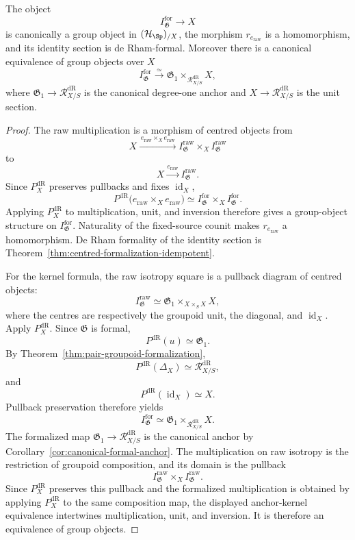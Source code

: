 \begin{theorem}
\label{thm:isotropy-group}
The object
\[
    I^{\mathrm{for}}_{\mathfrak G}\to X
\]
is canonically a group object in $(\mathcal H_{\Sp})_{/X}$, the morphism
$r_{e_{\mathrm{raw}}}$ is a homomorphism, and its identity section is de Rham-formal.  Moreover there is a canonical equivalence of group objects
over $X$
\[
    I^{\mathrm{for}}_{\mathfrak G}
    \xrightarrow{\simeq}
    \mathfrak G_1
    \times_{\mathcal R^{\mathrm{dR}}_{X/S}}
    X,
\]
where $\mathfrak G_1\to \mathcal R^{\mathrm{dR}}_{X/S}$ is the canonical degree-one anchor and
$X\to \mathcal R^{\mathrm{dR}}_{X/S}$ is the unit section.
\end{theorem}

\begin{proof}
The raw multiplication is a morphism of centred objects from
\[
    X\xrightarrow{\,e_{\mathrm{raw}}\times_Xe_{\mathrm{raw}}\,}
    I^{\mathrm{raw}}_{\mathfrak G}\times_XI^{\mathrm{raw}}_{\mathfrak G}
\]
to
\[
    X\xrightarrow{e_{\mathrm{raw}}}I^{\mathrm{raw}}_{\mathfrak G}.
\]
Since $P_X^{\mathrm{dR}}$ preserves pullbacks and fixes
$\operatorname{id}_X$,
\[
    P^{\mathrm{dR}}
    \bigl(e_{\mathrm{raw}}\times_Xe_{\mathrm{raw}}\bigr)
    \simeq
    I^{\mathrm{for}}_{\mathfrak G}
    \times_X
    I^{\mathrm{for}}_{\mathfrak G}.
\]
Applying $P_X^{\mathrm{dR}}$ to multiplication, unit, and inversion therefore gives a
group-object structure on $I^{\mathrm{for}}_{\mathfrak G}$.  Naturality of the fixed-source counit makes $r_{e_{\mathrm{raw}}}$ a homomorphism.  De Rham formality of the identity
section is Theorem~\ref{thm:centred-formalization-idempotent}.

For the kernel formula, the raw isotropy square is a pullback diagram of
centred objects:
\[
    I^{\mathrm{raw}}_{\mathfrak G}
    \simeq
    \mathfrak G_1
    \times_{X\times_SX}
    X,
\]
where the centres are respectively the groupoid unit, the diagonal, and
$\operatorname{id}_X$.  Apply $P_X^{\mathrm{dR}}$.  Since $\mathfrak G$ is formal,
\[
    P^{\mathrm{dR}}(u)\simeq\mathfrak G_1.
\]
By Theorem~\ref{thm:pair-groupoid-formalization},
\[
    P^{\mathrm{dR}}(\Delta_X)\simeq \mathcal R^{\mathrm{dR}}_{X/S},
\]
and
\[
    P^{\mathrm{dR}}(\operatorname{id}_X)\simeq X.
\]
Pullback preservation therefore yields
\[
    I^{\mathrm{for}}_{\mathfrak G}
    \simeq
    \mathfrak G_1\times_{\mathcal R^{\mathrm{dR}}_{X/S}}X.
\]
The formalized map $\mathfrak G_1\to \mathcal R^{\mathrm{dR}}_{X/S}$ is the canonical anchor by
Corollary~\ref{cor:canonical-formal-anchor}.  The multiplication on raw
isotropy is the restriction of groupoid composition, and its domain is the
pullback
\[
    I^{\mathrm{raw}}_{\mathfrak G}
    \times_X
    I^{\mathrm{raw}}_{\mathfrak G}.
\]
Since $P_X^{\mathrm{dR}}$ preserves this pullback and the formalized multiplication is
obtained by applying $P_X^{\mathrm{dR}}$ to the same composition map, the displayed
anchor-kernel equivalence intertwines multiplication, unit, and inversion.
It is therefore an equivalence of group objects.
\end{proof}

